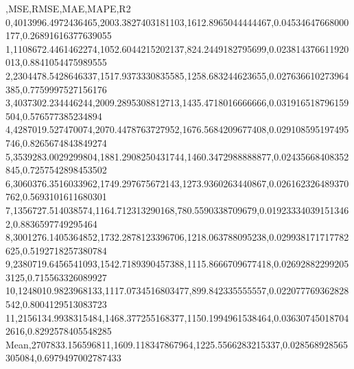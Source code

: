 ,MSE,RMSE,MAE,MAPE,R2
0,4013996.4972436465,2003.3827403181103,1612.8965044444467,0.04534647668000177,0.26891616377639055
1,1108672.4461462274,1052.6044215202137,824.2449182795699,0.023814376611920013,0.8841054475989555
2,2304478.5428646337,1517.9373330835585,1258.683244623655,0.027636610273964385,0.7759997527156176
3,4037302.234446244,2009.2895308812713,1435.4718016666666,0.031916518796159504,0.576577385234894
4,4287019.527470074,2070.4478763727952,1676.5684209677408,0.029108595197495746,0.8265674843849274
5,3539283.0029299804,1881.2908250431744,1460.3472988888877,0.02435668408352845,0.7257542898453502
6,3060376.3516033962,1749.297675672143,1273.9360263440867,0.026162326489370762,0.5693101611680301
7,1356727.514038574,1164.712313290168,780.5590338709679,0.019233340391513462,0.8836597749295464
8,3001276.1405364852,1732.2878123396706,1218.063788095238,0.029938171717782625,0.5192718257380784
9,2380719.6456541093,1542.7189390457388,1115.8666709677418,0.026928822992053125,0.715563326089927
10,1248010.9823968133,1117.0734516803477,899.842335555557,0.022077769362828542,0.8004129513083723
11,2156134.9938315484,1468.377255168377,1150.1994961538464,0.036307450187042616,0.8292578405548285
Mean,2707833.156596811,1609.118347867964,1225.5566283215337,0.028568928565305084,0.6979497002787433
